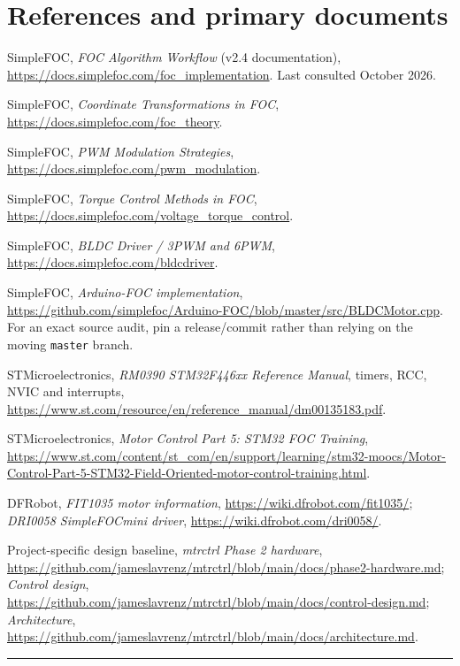 \documentclass[10pt,letterpaper]{article}
\begin{document}
\section{References and primary documents}
\begingroup\sloppy
\begin{enumerate}[label={[\arabic*]},leftmargin=28pt]
\item SimpleFOC, \emph{FOC Algorithm Workflow} (v2.4 documentation), \url{https://docs.simplefoc.com/foc_implementation}. Last consulted October 2026.
\item SimpleFOC, \emph{Coordinate Transformations in FOC}, \url{https://docs.simplefoc.com/foc_theory}.
\item SimpleFOC, \emph{PWM Modulation Strategies}, \url{https://docs.simplefoc.com/pwm_modulation}.
\item SimpleFOC, \emph{Torque Control Methods in FOC}, \url{https://docs.simplefoc.com/voltage_torque_control}.
\item SimpleFOC, \emph{BLDC Driver / 3PWM and 6PWM}, \url{https://docs.simplefoc.com/bldcdriver}.
\item SimpleFOC, \emph{Arduino-FOC implementation}, \url{https://github.com/simplefoc/Arduino-FOC/blob/master/src/BLDCMotor.cpp}. For an exact source audit, pin a release/commit rather than relying on the moving \texttt{master} branch.
\item STMicroelectronics, \emph{RM0390 STM32F446xx Reference Manual}, timers, RCC, NVIC and interrupts, \url{https://www.st.com/resource/en/reference_manual/dm00135183.pdf}.
\item STMicroelectronics, \emph{Motor Control Part 5: STM32 FOC Training}, \url{https://www.st.com/content/st_com/en/support/learning/stm32-moocs/Motor-Control-Part-5-STM32-Field-Oriented-motor-control-training.html}.
\item DFRobot, \emph{FIT1035 motor information}, \url{https://wiki.dfrobot.com/fit1035/}; \emph{DRI0058 SimpleFOCmini driver}, \url{https://wiki.dfrobot.com/dri0058/}.
\item Project-specific design baseline, \emph{mtrctrl Phase 2 hardware}, \url{https://github.com/jameslavrenz/mtrctrl/blob/main/docs/phase2-hardware.md}; \emph{Control design}, \url{https://github.com/jameslavrenz/mtrctrl/blob/main/docs/control-design.md}; \emph{Architecture}, \url{https://github.com/jameslavrenz/mtrctrl/blob/main/docs/architecture.md}.
\end{enumerate}
\endgroup
\vfill
\hrule{}
\end{document}
